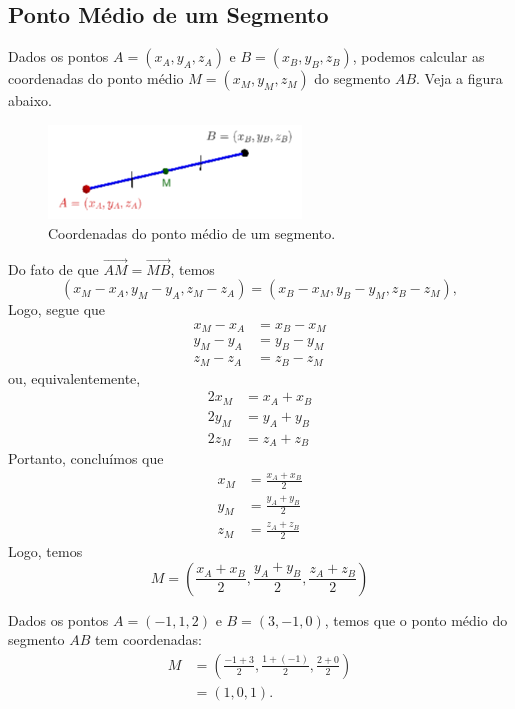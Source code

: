 \subsection{Ponto Médio de um Segmento}


Dados os pontos $A = (x_A,y_A,z_A)$ e $B = (x_B,y_B,z_B)$, podemos calcular as coordenadas do ponto médio $M = (x_M,y_M,z_M)$ do segmento $AB$. Veja a figura abaixo.

\begin{figure}[H]
\centering
\includegraphics[width=0.6\textwidth]{./cap_estudo/dados/fig_scoord_pm/fig}
\caption{Coordenadas do ponto médio de um segmento.}
\label{fig:scoord_pm}
\end{figure}  

Do fato de que $\overrightarrow{AM} = \overrightarrow{MB}$, temos
\begin{equation}
  (x_M-x_A,y_M-y_A,z_M-z_A)=(x_B-x_M,y_B-y_M,z_B-z_M),
\end{equation}
Logo, segue que
\begin{align}
  x_M-x_A &= x_B-x_M\\
  y_M-y_A &= y_B-y_M\\
  z_M-z_A &= z_B-z_M
\end{align}
ou, equivalentemente,
\begin{align}
  2x_M &= x_A+x_B\\
  2y_M &= y_A+y_B\\
  2z_M &= z_A+z_B
\end{align}
Portanto, concluímos que
\begin{align}
  x_M &= \frac{x_A+x_B}{2}\\
  y_M &= \frac{y_A+y_B}{2}\\
  z_M &= \frac{z_A+z_B}{2}
\end{align}  
Logo, temos
\begin{equation}
M = \left(\frac{x_A+x_B}{2},\frac{y_A+y_B}{2},\frac{z_A+z_B}{2}\right)
\end{equation}

\begin{ex}
  Dados os pontos $A = (-1,1,2)$ e $B = (3,-1,0)$, temos que o ponto médio do segmento $AB$ tem coordenadas:
  \begin{align}
    M &= \left(\frac{-1+3}{2},\frac{1+(-1)}{2},\frac{2+0}{2}\right)\\
    &= (1,0,1).
  \end{align}
\end{ex}

